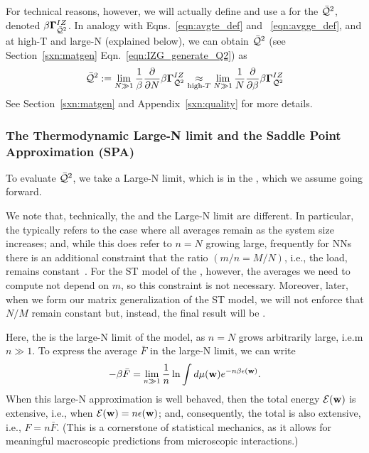 {For technical reasons, however, we will actually define and use a
\GeneratingFunction for the \AverageLayerQualitySquared $\bar{\mathcal{Q}}^{2}$, denoted $\beta\mathbf{\Gamma}^{IZ}_{\bar{\mathcal{Q}}^{2}}$.
In analogy with Eqns.~\ref{eqn:avgte_def} and ~\ref{eqn:avgge_def}, and at high-T and large-N (explained below),
we can obtain $\bar{\mathcal{Q}}^{2}$ (see Section~\ref{sxn:matgen} Eqn.~\ref{eqn:IZG_generate_Q2}) as
\begin{align}
  \label{eqn:QT_def}
  \bar{\mathcal{Q}}^{2} := \lim_{N\gg 1}\frac{1}{\beta}\frac{\partial }{\partial N}\beta\mathbf{\Gamma}^{IZ}_{\bar{\mathcal{Q}}^{2}}
  \underset{\text{high-}T}{\approx}
\lim_{N\gg 1}\frac{1}{N}\frac{\partial }{\partial \beta}\beta\mathbf{\Gamma}^{IZ}_{\bar{\mathcal{Q}}^{2}}
\end{align}
See Section~\ref{sxn:matgen} and Appendix~\ref{sxn:quality} for more details.


\subsubsection{The Thermodynamic Large-N limit and the Saddle Point Approximation (SPA)}
\label{sxn:largeN_and_SPA}
To evaluate $\bar{\mathcal{Q}}^{2}$, we take a Large-N limit, which is 
in the \ThermodynamicLimit, which we assume going forward.

We note that, technically, the \ThermodynamicLimit and the Large-N limit are different.
In particular, the \ThermodynamicLimit typically refers to the case where all \Thermodynamic averages remain \SizeIntensive as the system size increases; and, while this does refer to $n=N$ growing large, frequently for NNs there is an additional constraint that the ratio $(m/n = M/N)$, i.e., the load, remains constant~\cite{SST92,MM17_TR_v1}.
For the ST model of the \Perceptron, however, the \Thermodynamic averages we need to compute not depend on $m$,
so this constraint is not necessary.
Moreover, later, when we form our matrix generalization of the ST model, we will not
enforce that $N/M$ remain constant but, instead, the final result will be \SizeConsistent.

Here, the \ThermodynamicLimit is the large-N limit of the model, as $n=N$ grows arbitrarily large, i.e.m $n \gg 1$.
To express the average \FreeEnergy $\bar{F}$ in the large-N limit, we can write
\begin{align}
  -\beta\bar{F} = \lim_{n\gg 1}\frac{1}{n}\ln \int d\mu({\mathbf{w}}) e^{-n\beta\epsilon({\mathbf{w}})}  .
\end{align}
When this large-N approximation is well behaved,
then the total energy $\mathcal{E}(\mathbf{w})$ is extensive, i.e., when $\mathcal{E}(\mathbf{w})=n\epsilon({\mathbf{w}})$;
and, consequently, the total \FreeEnergy is also extensive, i.e., $F=n\bar{F}$.
(This is a cornerstone of statistical mechanics, as it allows for meaningful macroscopic predictions from microscopic interactions.)


}

